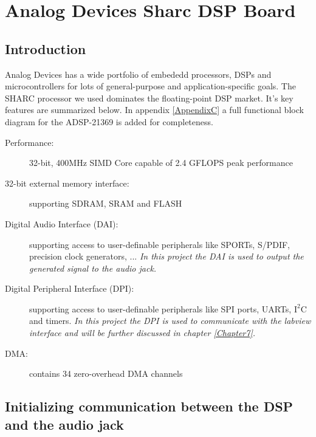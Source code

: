 \section{Analog Devices Sharc DSP Board}
\subsection{Introduction}
Analog Devices has a wide portfolio of embededd processors, DSPs and microcontrollers for lots of general-purpose and application-specific goals. The  SHARC processor we used dominates the floating-point DSP market. It's key features are summarized below. In appendix \ref{AppendixC} a full functional block diagram for the ADSP-21369 is added for completeness.
\begin{description}
\item[Performance:] 32-bit, 400MHz SIMD Core capable of 2.4 GFLOPS peak performance
\item[32-bit external memory interface:] supporting SDRAM, SRAM and FLASH
\item[Digital Audio Interface (DAI):] supporting access to user-definable peripherals like SPORTs, S/PDIF, precision clock generators, ... \emph{In this project the DAI is used to output the generated signal to the audio jack.}
\item[Digital Peripheral Interface (DPI):] supporting access to user-definable peripherals like SPI ports, UARTs, $\mathrm{I^{2}C}$ and timers. \emph{In this project the DPI is used to communicate with the labview interface and will be further discussed in chapter \ref{Chapter7}.}
\item[DMA:] contains 34 zero-overhead DMA channels
\end{description}
\subsection{Initializing communication between the DSP and the audio jack}

